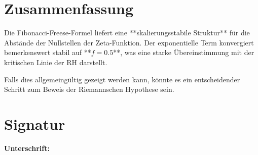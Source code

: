 \documentclass[a4paper,11pt]{article}
\begin{document}
\section{Zusammenfassung}

Die Fibonacci-Freese-Formel liefert eine **skalierungsstabile Struktur** für die Abstände der Nullstellen der Zeta-Funktion.  
Der exponentielle Term konvergiert bemerkenswert stabil auf **\( f = 0.5 \)**, was eine starke Übereinstimmung mit der kritischen Linie der RH darstellt.  

Falls dies allgemeingültig gezeigt werden kann, könnte es ein entscheidender Schritt zum Beweis der Riemannschen Hypothese sein.

\section{Signatur}

\noindent \textbf{Unterschrift:} \\
\vspace{1.5cm} \\
 \\
[Datum] \\
[Ort] \\
\end{document}
